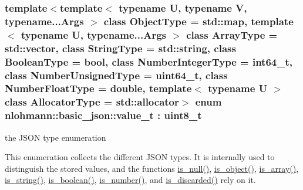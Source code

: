 \subsubsection[{\texorpdfstring{value\+\_\+t}{value\_t}}]{\setlength{\rightskip}{0pt plus 5cm}template$<$template$<$ typename U, typename V, typename...\+Args $>$ class Object\+Type = std\+::map, template$<$ typename U, typename...\+Args $>$ class Array\+Type = std\+::vector, class String\+Type  = std\+::string, class Boolean\+Type  = bool, class Number\+Integer\+Type  = int64\+\_\+t, class Number\+Unsigned\+Type  = uint64\+\_\+t, class Number\+Float\+Type  = double, template$<$ typename U $>$ class Allocator\+Type = std\+::allocator$>$ enum {\bf nlohmann\+::basic\+\_\+json\+::value\+\_\+t} \+: uint8\+\_\+t\hspace{0.3cm}{\ttfamily [strong]}}\hypertarget{a00025_a231b02148577b69a154b2ce2c87a5522}{}\label{a00025_a231b02148577b69a154b2ce2c87a5522}


the J\+S\+ON type enumeration 

This enumeration collects the different J\+S\+ON types. It is internally used to distinguish the stored values, and the functions \hyperlink{a00025_a685d9d6a8a45bfcb8455b147257cdffb}{is\+\_\+null()}, \hyperlink{a00025_a0d96ff13001977a93d65f0a97279d316}{is\+\_\+object()}, \hyperlink{a00025_a1af360cb513cc32f28e80ddd0b9d7666}{is\+\_\+array()}, \hyperlink{a00025_ab22c8d61eca51f0308c263487bd35f03}{is\+\_\+string()}, \hyperlink{a00025_a8f7e67d903f918cd08261219fb47a9f0}{is\+\_\+boolean()}, \hyperlink{a00025_a1407f91b4689bbc56d1a3c401a5bb649}{is\+\_\+number()}, and \hyperlink{a00025_a66c051561828b2c4eeaad896a72bec99}{is\+\_\+discarded()} rely on it.

